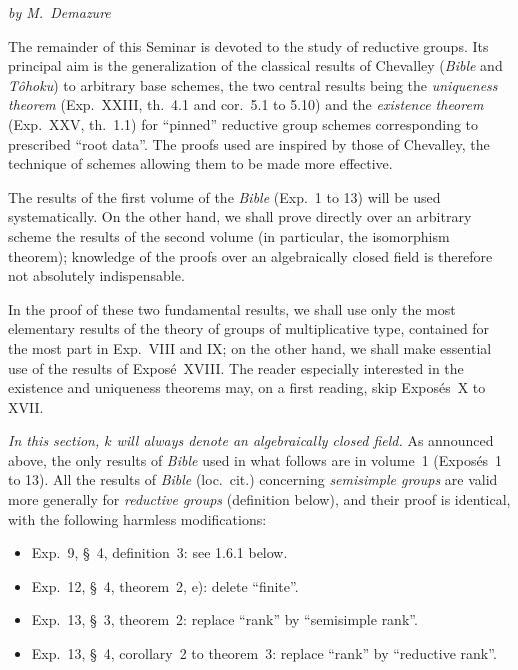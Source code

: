 \label{XIX}
\begin{center}\textit{by M.~Demazure}\end{center}

{\renewcommand{\thefootnote}{(0)}}%
The remainder of this Seminar is devoted to the study of reductive groups. Its principal aim is the generalization of the classical results of Chevalley (\textit{Bible} and \textit{T\^ohoku}){\renewcommand{\thefootnote}{(1)}} to arbitrary base schemes, the two central results being the \emph{uniqueness theorem} (Exp.~XXIII, th.~4.1 and cor.~5.1 to 5.10) and the \emph{existence theorem} (Exp.~XXV, th.~1.1) for ``pinned'' reductive group schemes corresponding to prescribed ``root data''. The proofs used are inspired by those of Chevalley, the technique of schemes allowing them to be made more effective.

The results of the first volume of the \textit{Bible} (Exp.~1 to 13) will be used systematically. On the other hand, we shall prove directly over an arbitrary scheme the results of the second volume (in particular, the isomorphism theorem); knowledge of the proofs over an algebraically closed field is therefore not absolutely indispensable.

In the proof of these two fundamental results, we shall use only the most elementary results of the theory of groups of multiplicative type, contained for the most part in Exp.~VIII and IX; on the other hand, we shall make essential use of the results of Expos\'e~XVIII.{\renewcommand{\thefootnote}{(2)}} The reader especially interested in the existence and uniqueness theorems may, on a first reading, skip Expos\'es~X to XVII.

\label{XIX.sec.1}
 \emph{In this section, $k$ will always denote an algebraically closed field.} As announced above, the only results of \textit{Bible} used in what follows are in volume~1 (Expos\'es~1 to 13). All the results of \textit{Bible} (loc.~cit.) concerning \emph{semisimple groups} are valid more generally for \emph{reductive groups} (definition below), and their proof is identical, with the following harmless modifications:
\begin{itemize}
\item Exp.~9, \S~4, definition~3: see 1.6.1 below.
\item Exp.~12, \S~4, theorem~2, e): delete ``finite''.
\item Exp.~13, \S~3, theorem~2: replace ``rank'' by ``semisimple rank''.
\item Exp.~13, \S~4, corollary~2 to theorem~3: replace ``rank'' by ``reductive rank''.
\end{itemize}

